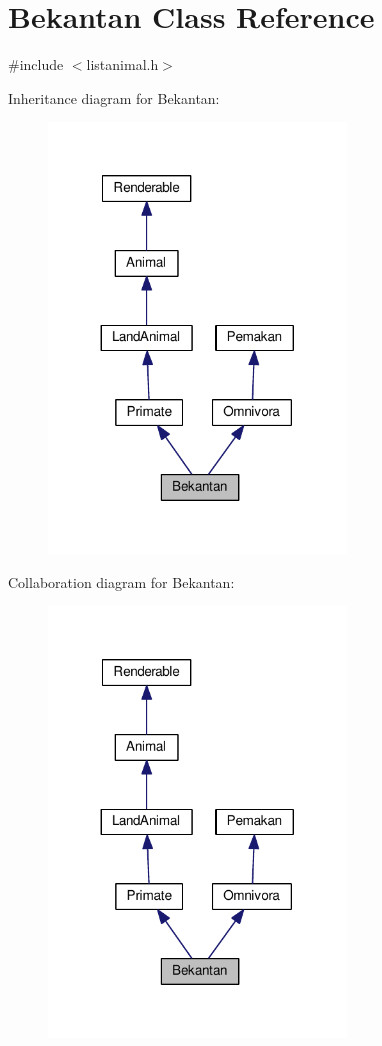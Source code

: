 \hypertarget{classBekantan}{}\section{Bekantan Class Reference}
\label{classBekantan}


{\ttfamily \#include $<$listanimal.\+h$>$}



Inheritance diagram for Bekantan\+:
\nopagebreak
\begin{figure}[H]
\begin{center}
\leavevmode
\includegraphics[width=224pt]{classBekantan__inherit__graph}
\end{center}
\end{figure}


Collaboration diagram for Bekantan\+:
\nopagebreak
\begin{figure}[H]
\begin{center}
\leavevmode
\includegraphics[width=224pt]{classBekantan__coll__graph}
\end{center}
\end{figure}
